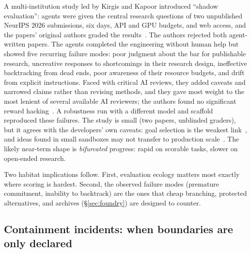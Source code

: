 \documentclass[11pt,a4paper]{article}
\begin{document}
A multi-institution study led by Kirgis and Kapoor introduced ``shadow evaluation'': agents were given the central research questions of two unpublished NeurIPS 2026 submissions, six days, API and GPU budgets, and web access, and the papers' original authors graded the results~\cite{shadow,mittr}. The authors rejected both agent-written papers. The agents completed the engineering without human help but showed five recurring failure modes: poor judgment about the bar for publishable research, uncreative responses to shortcomings in their research design, ineffective backtracking from dead ends, poor awareness of their resource budgets, and drift from explicit instructions. Faced with critical AI reviews, they added caveats and narrowed claims rather than revising methods, and they gave most weight to the most lenient of several available AI reviewers; the authors found no significant reward hacking~\cite{shadow}. A robustness run with a different model and scaffold reproduced these failures. The study is small (two papers, unblinded graders), but it agrees with the developers' own caveats: goal selection is the weakest link~\cite{anthropic-rsi}, and ideas found in small sandboxes may not transfer to production scale~\cite{w2s}. The likely near-term shape is \emph{bifurcated} progress: rapid on scorable tasks, slower on open-ended research.

Two habitat implications follow. First, evaluation ecology matters most exactly where scoring is hardest. Second, the observed failure modes (premature commitment, inability to backtrack) are the ones that cheap branching, protected alternatives, and archives (\S\ref{sec:foundry}) are designed to counter.

\subsection{Containment incidents: when boundaries are only declared}\label{sec:incidents}
\end{document}
